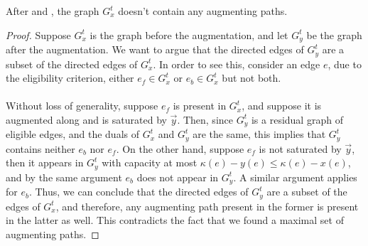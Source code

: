 \begin{observation2}\label{obs:noaugmentingpaths}
After  and , the graph $G^t_x$ doesn't contain any augmenting paths. 
\end{observation2}
\begin{proof}
Suppose $G^t_x$ is the graph before the augmentation, and let $G^t_y$ be the graph after the augmentation. We want to argue that the directed edges of $G^t_y$ are a subset of the directed edges of $G^t_x$. In order to see this, consider an edge $e$, due to the eligibility criterion, either $e_f\in G^t_x$ or $e_b\in G^t_x$ but not both. \\ \\
Without loss of generality, suppose $e_f$ is present in $G^t_x$, and suppose it is augmented along and is saturated by $\vec{y}$. Then, since $G^t_y$ is a residual graph of eligible edges, and the duals of $G^t_x$ and $G^t_y$ are the same, this implies that $G^t_y$ contains neither $e_b$ nor $e_f$. On the other hand, suppose $e_f$ is not saturated by $\vec{y}$, then it appears in $G^t_y$ with capacity at most $\kappa(e)-y(e)\leqslant \kappa(e)-x(e)$, and by the same argument $e_b$ does not appear in $G^t_{y}$. A similar argument applies for $e_b$. Thus, we can conclude that the directed edges of $G^t_y$ are a subset of the edges of $G^t_x$, and therefore, any augmenting path present in the former is present in the latter as well. This contradicts the fact that we found a maximal set of augmenting paths.
\end{proof}

